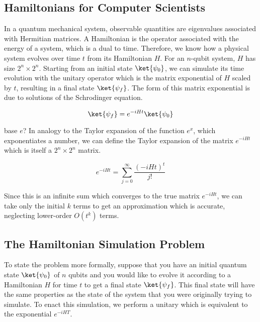 \subsection{Hamiltonians for Computer Scientists}

In a quantum mechanical system, observable quantities are eigenvalues
associated with Hermitian matrices. A Hamiltonian is the operator associated
with the energy of a system, which is a dual to time. Therefore, we know
how a physical system evolves over time $t$ from its Hamiltonian $H$. For
an $n$-qubit system, $H$ has size $2^n \times 2^n$.
Starting from an initial state $\ket{\psi_0}$, we can simulate its time
evolution with the unitary operator which is the
matrix exponential of $H$ scaled by $t$, resulting in a final state $\ket{\psi_f}$.
The form of this matrix exponential is due to solutions of the Schrodinger
equation.

\begin{equation}
\ket{\psi_f} = e^{-iHt} \ket{\psi_0}
\end{equation}

 base $e$? In analogy to 
the Taylor expansion of the function $e^x$, which exponentiates a number,
we can define the Taylor expansion of the matrix $e^{-iHt}$ which is itself
a $2^n\times 2^n$ matrix.

\begin{equation}
e^{-iHt} = \sum_{j=0}^{\infty} \frac{(-iHt)^t}{j!}
\end{equation}

Since this is an infinite sum which converges to the true matrix
$e^{-iHt}$, we can take only the initial $k$ terms to get an approximation
which is accurate, neglecting lower-order $O(t^k)$ terms.

\subsection{The Hamiltonian Simulation Problem}

To state the problem more formally, suppose that you have an initial
quantum state $\ket{\psi_0}$ of $n$ qubits
and you would like to evolve it according to a Hamiltonian $H$ for time
$t$ to get
a final state $\ket{\psi_f}$. This final state will have the same properties
as the state of the system that you were originally trying to simulate. To
enact this simulation, we perform a unitary which is equivalent to the
exponential $e^{-iHT}$.

